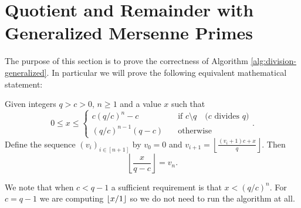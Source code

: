 
\section{Quotient and Remainder with Generalized Mersenne Primes}
\label{sec:division}

The purpose of this section is to prove the correctness of Algorithm \ref{alg:division-generalized}.
In particular we will prove the following equivalent mathematical statement:

\begin{theorem}\label{thm:simple-div}
   Given integers $q>c>0$, $n\ge 1$ and a value $x$ such that
   $$0\le x \le \begin{cases}
      c (q/c)^{n} - c &\quad\text{if } c\!\setminus\!q \quad\text{($c$ divides $q$)} \\
      (q/c)^{n-1}(q-c) &\quad\text{otherwise}
   \end{cases}.$$
   Define the sequence $(v_i)_{i\in[n+1]}$ by
   $
      v_0 = 0$ and
      $v_{i+1} = \left\lfloor\frac{(v_i+1)c+x}{q}\right\rfloor$.
   Then
   $$
      \left\lfloor\frac{x}{q-c}\right\rfloor = v_n.$$
\end{theorem}
We note that when $c<q-1$ a sufficient requirement is that $x< (q/c)^n$.
For $c=q-1$ we are computing $\lfloor {x/1} \rfloor$ so we do not need to run the algorithm at all.

